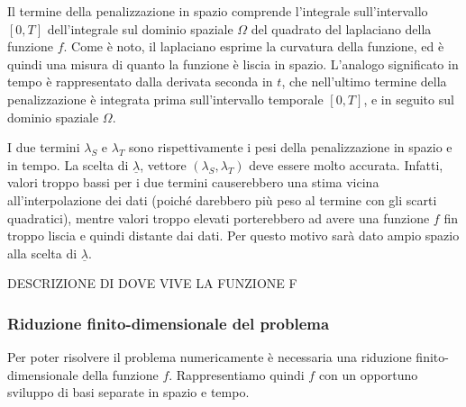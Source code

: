 \documentclass[a4paper,11pt,twoside,openright]{book}							%
\begin{document}
Il termine della penalizzazione in spazio comprende l'integrale sull'intervallo $[0,T]$ dell'integrale sul dominio spaziale $\Omega$ del quadrato del laplaciano della funzione $f$. Come è noto, il laplaciano esprime la curvatura della funzione, ed è quindi una misura di quanto la funzione è liscia in spazio. L'analogo significato in tempo è rappresentato dalla derivata seconda in $t$, che nell'ultimo termine della penalizzazione è integrata prima sull'intervallo temporale $[0,T]$, e in seguito sul dominio spaziale $\Omega$.

I due termini $\lambda_S$ e $\lambda_T$ sono rispettivamente i pesi della penalizzazione in spazio e in tempo. La scelta di $\underline \lambda$, vettore $ (\lambda_S,\lambda_T) $ deve essere molto accurata. Infatti, valori troppo bassi per i due termini causerebbero una stima vicina all'interpolazione dei dati (poiché darebbero più peso al termine con gli scarti quadratici), mentre valori troppo elevati porterebbero ad avere una funzione $f$ fin troppo liscia e quindi distante dai dati. Per questo motivo sarà dato ampio spazio alla scelta di $\underline \lambda$.

DESCRIZIONE DI DOVE VIVE LA FUNZIONE F

\subsubsection*{Riduzione finito-dimensionale del problema}

Per poter risolvere il problema numericamente è necessaria una riduzione finito-dimensionale della funzione $f$. Rappresentiamo quindi $f$ con un opportuno sviluppo di basi separate in spazio e tempo.
\end{document}
